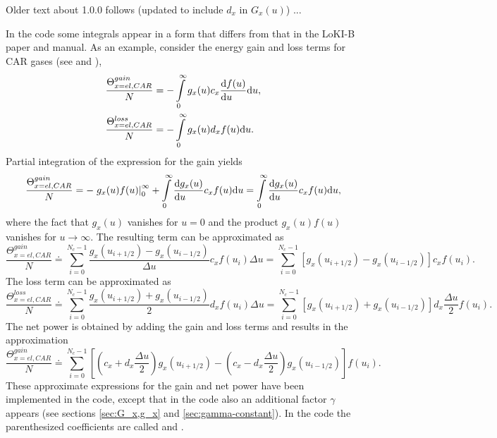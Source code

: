 \documentclass{book}
\begin{document}
Older text about 1.0.0 follows (updated to include $d_x$ in $G_x(u)$) ...

In the code some integrals appear in a form that differs from that in the LoKI-B
paper and manual. As an example, consider the energy gain and loss terms for CAR
gases (see \cite[eqn 24a--h]{Tejero2019} and \cite[eqn 28a--h]{Manual_1_0_0}),
\begin{align}
	\frac{\Theta^{gain}_{x=el,CAR}}{N} &= -\int\limits_0^\infty g_x(u)c_x\DERIV{f(u)}{u}\dd{u},
	\\
	\frac{\Theta^{loss}_{x=el,CAR}}{N} &= -\int\limits_0^\infty g_x(u)d_xf(u)\dd{u}.
\end{align}
Partial integration of the expression for the gain yields
\begin{equation}
	\frac{\Theta^{gain}_{x=el,CAR}}{N}
	=
	-\left.g_x(u)f(u)\right|_0^\infty
	+\int\limits_0^\infty \DERIV{g_x(u)}{u}c_xf(u)\dd{u}
	=
	\int\limits_0^\infty \DERIV{g_x(u)}{u}c_xf(u)\dd{u},
\end{equation}
where the fact that $g_x(u)$ vanishes for $u=0$ and the product $g_x(u)f(u)$ vanishes
for $u\rightarrow\infty$. The resulting term can be approximated as
\begin{equation}
	\frac{\Theta^{gain}_{x=el,CAR}}{N}
	\doteq
	\sum_{i=0}^{N_c-1} \frac{g_x(u_{i+1/2})-g_x(u_{i-1/2})}{\Delta u}c_xf(u_i)\Delta{u}
	=
	\sum_{i=0}^{N_c-1} \left[g_x(u_{i+1/2})-g_x(u_{i-1/2})\right]c_xf(u_i).
\end{equation}
The loss term can be approximated as
\begin{equation}
	\frac{\Theta^{loss}_{x=el,CAR}}{N}
	\doteq
	\sum_{i=0}^{N_c-1} \frac{g_x(u_{i+1/2})+g_x(u_{i-1/2})}{2}d_xf(u_i)\Delta{u}
	=
	\sum_{i=0}^{N_c-1} \left[g_x(u_{i+1/2})+g_x(u_{i-1/2})\right]d_x\frac{\Delta u}{2}f(u_i).
\end{equation}
The net power is obtained by adding the gain and loss terms and results in
the approximation
\begin{equation}
	\frac{\Theta^{gain}_{x=el,CAR}}{N}
	\doteq
	\sum_{i=0}^{N_c-1} \left[\left(c_x+d_x\frac{\Delta u}{2}\right)g_x(u_{i+1/2})-\left(c_x-d_x\frac{\Delta u}{2}\right)g_x(u_{i-1/2})\right]f(u_i).
\end{equation}
These approximate expressions for the gain and net power have been implemented in
the code, except that in the code also an additional factor $\gamma$ appears (see
sections \eqref{sec:G_x,g_x} and \eqref{sec:gamma-constant}).
In the code the parenthesized coefficients are called  and .
\end{document}
